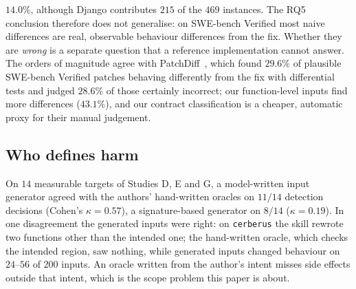 $14.0\%$, although Django contributes $215$ of the $469$ instances.  The RQ5 conclusion
therefore does not generalise: on SWE-bench Verified most naive differences are real, observable behaviour differences from the fix.
Whether they are \emph{wrong} is a separate question that a reference implementation cannot answer.  The orders of magnitude agree
with PatchDiff~\cite{wang2026patchdiff}, which found $29.6\%$ of plausible SWE-bench Verified patches behaving differently from the
fix with differential tests and judged $28.6\%$ of those certainly incorrect; our function-level inputs find more differences ($43.1\%$),
and our contract classification is a cheaper, automatic proxy for their manual judgement.

\subsection{Who defines harm}
\label{sec:eval-oracle}
On $14$ measurable targets of Studies D, E and G, a model-written input generator agreed with the authors' hand-written oracles on
$11/14$ detection decisions (Cohen's $\kappa=0.57$), a signature-based generator on $8/14$ ($\kappa=0.19$).  In one disagreement the
generated inputs were right: on \texttt{cerberus} the skill rewrote two functions other than the intended one; the hand-written
oracle, which checks the intended region, saw nothing, while generated inputs changed behaviour on $24$--$56$ of $200$ inputs.  An
oracle written from the author's intent misses side effects outside that intent, which is the scope problem this paper is about.
